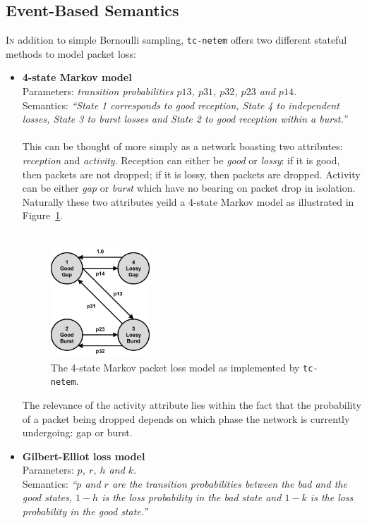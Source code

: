 \newpage

\subsection{Event-Based Semantics}\label{subsection:event_based_semantics}

\lettrine{I}{n} addition to simple Bernoulli sampling, \texttt{tc-netem} offers two different stateful methods to
model packet
loss\cite{tc_netem_8_man}:
\begin{itemize}
    \item \textbf{4-state Markov model} \\
    Parameters: \emph{transition probabilities $p13$, $p31$, $p32$, $p23$ and $p14$.} \\
    Semantics: \emph{``State 1 corresponds to good reception, State 4 to independent losses, State 3 to burst losses
    and State 2 to good reception within a burst.''} \\ \\
    This can be thought of more simply as a network boasting two attributes: \emph{reception} and \emph{activity}.
    Reception can either be \emph{good} or \emph{lossy}: if it is good, then packets are not dropped; if it is lossy,
    then packets are dropped. Activity can be either \emph{gap} or \emph{burst} which have no bearing on packet drop
    in isolation. Naturally these two attributes yeild a 4-state Markov model as illustrated in
    Figure~\ref{fig:chapter_3_design-tc_netem_4_state_markov_diagram}. \\ \\
    \begin{figure}[!h]
        \includegraphics[width=0.35\textwidth]{images/chapter_3_design/tc_netem_4_state_markov_diagram}
        \centering
        \caption{The 4-state Markov packet loss model as implemented by
        \texttt{tc-netem}\cite{tc_netem_src}.}\label{fig:chapter_3_design-tc_netem_4_state_markov_diagram}
    \end{figure}

    The relevance of the activity attribute lies within the fact that the probability of a packet being dropped
    depends on which phase the network is currently undergoing: gap or burst.
    \item \textbf{Gilbert-Elliot loss model} \\
    Parameters: \emph{$p$, $r$, $h$ and $k$.} \\
    Semantics: \emph{``$p$ and $r$ are the transition probabilities between the bad and the good states, $1-h$ is the
    loss probability in the bad state and $1-k$ is the loss probability in the good state.''}
\end{itemize}

